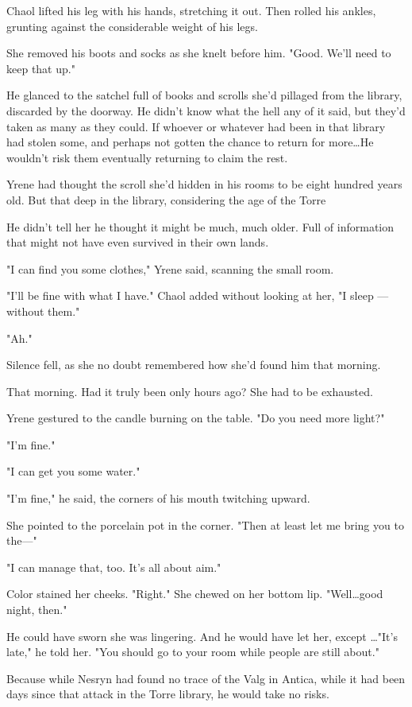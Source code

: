 Chaol lifted his leg with his hands, stretching it out.
Then rolled his ankles, grunting against the considerable weight of his legs.

She removed his boots and socks as she knelt before him.
"Good.
We'll need to keep that up."

He glanced to the satchel full of books and scrolls she'd pillaged from the library, discarded by the doorway.
He didn't know what the hell any of it said, but they'd taken as many as they could.
If whoever or whatever had been in that library had stolen some, and perhaps not gotten the chance to return for more\ldots He wouldn't risk them eventually returning to claim the rest.

Yrene had thought the scroll she'd hidden in his rooms to be eight hundred years old.
But that deep in the library, considering the age of the Torre 

He didn't tell her he thought it might be much, much older.
Full of information that might not have even survived in their own lands.

"I can find you some clothes," Yrene said, scanning the small room.

"I'll be fine with what I have."
Chaol added without looking at her, "I sleep ---without them."

"Ah."

Silence fell, as she no doubt remembered how she'd found him that morning.

That morning.
Had it truly been only hours ago?
She had to be exhausted.

Yrene gestured to the candle burning on the table.
"Do you need more light?"

"I'm fine."

"I can get you some water."

"I'm fine," he said, the corners of his mouth twitching upward.

She pointed to the porcelain pot in the corner.
"Then at least let me bring you to the---"

"I can manage that, too.
It's all about aim."

Color stained her cheeks.
"Right."
She chewed on her bottom lip.
"Well\ldots good night, then."

He could have sworn she was lingering.
And he would have let her, except \ldots"It's late," he told her.
"You should go to your room while people are still about."

Because while Nesryn had found no trace of the Valg in Antica, while it had been days since that attack in the Torre library, he would take no risks.

